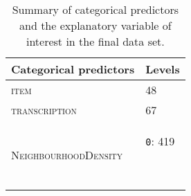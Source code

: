 \begin{table}\fontsize{10}{11}
\caption{Summary of categorical predictors and the explanatory variable of interest in the final data set.}
\label{tab:4.2}
\centering
\begin{tabular}{ll}
\lsptoprule
Categorical predictors                & Levels                                                   \\
\midrule
\textsc{item}                                  & 48                                                       \\
\textsc{transcription}                         & 67                                                       \\
\multirow{2}{*}{\textsc{NeighbourhoodDensity}} & \texttt{0}: 419

~ ~~


\end{tabular}
\end{table}
